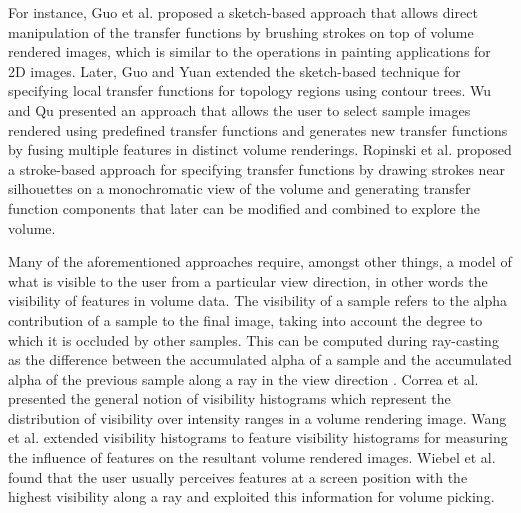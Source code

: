 \documentclass[twoside,twocolumn,10pt]{article}
\begin{document}
For instance, Guo et al. \cite{guo_wysiwyg_2011} proposed a sketch-based approach that allows direct manipulation of the transfer functions by brushing strokes on top of volume rendered images, which is similar to the operations in painting applications for 2D images.
Later, Guo and Yuan \cite{guo_local_2013} extended the sketch-based technique for specifying local transfer functions for topology regions using contour trees.
Wu and Qu \cite{wu_interactive_2007} presented an approach that allows the user to select sample images rendered using predefined transfer functions and generates new transfer functions by fusing multiple features in distinct volume renderings.
Ropinski et al. \cite{ropinski_stroke-based_2008} proposed a stroke-based approach for specifying transfer functions by drawing strokes near silhouettes on a monochromatic view of the volume and generating transfer function components \cite{castro_transfer_1998} that later can be modified and combined to explore the volume.


Many of the aforementioned approaches require, amongst other things, a model of what is visible to the user from a particular view direction, in other words the visibility of features in volume data.
The visibility of a sample refers to the alpha contribution of a sample to the final image, taking into account the degree to which it is occluded by other samples. This can be computed during ray-casting as the difference between the accumulated alpha of a sample and the accumulated alpha of the previous sample along a ray in the view direction \cite{emsenhuber_visibility_2008}.
Correa et al. presented the general notion of visibility histograms \cite{correa_visibility_2011} which represent the distribution of visibility over intensity ranges in a volume rendering image.
Wang et al. \cite{wang_efficient_2011} extended visibility histograms to feature visibility histograms for measuring the influence of features on the resultant volume rendered images.
Wiebel et al. \cite{wiebel_wysiwyp:_2012} found that the user usually perceives features at a screen position with the highest visibility along a ray and exploited this information for volume picking.



\end{document}
